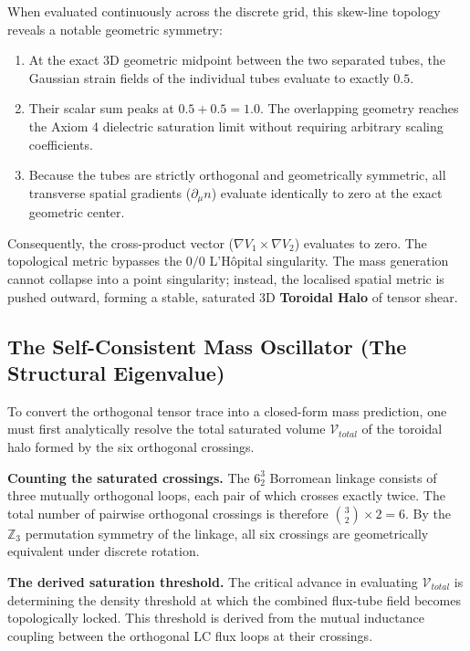 When evaluated continuously across the discrete grid, this skew-line topology reveals a notable geometric symmetry:
\begin{enumerate}
    \item At the exact 3D geometric midpoint between the two separated tubes, the Gaussian strain fields of the individual tubes evaluate to exactly $0.5$. 
    \item Their scalar sum peaks at $0.5 + 0.5 = \mathbf{1.0}$. The overlapping geometry reaches the Axiom 4 dielectric saturation limit without requiring arbitrary scaling coefficients.
    \item Because the tubes are strictly orthogonal and geometrically symmetric, all transverse spatial gradients ($\partial_\mu n$) evaluate identically to zero at the exact geometric center.
\end{enumerate}

Consequently, the cross-product vector ($\nabla V_1 \times \nabla V_2$) evaluates to zero. The topological metric bypasses the $0/0$ L'Hôpital singularity. The mass generation cannot collapse into a point singularity; instead, the localised spatial metric is pushed outward, forming a stable, saturated 3D \textbf{Toroidal Halo} of tensor shear.

\subsection{The Self-Consistent Mass Oscillator (The Structural Eigenvalue)}
To convert the orthogonal tensor trace into a closed-form mass prediction, one must first analytically resolve the total saturated volume $\mathcal{V}_{total}$ of the toroidal halo formed by the six orthogonal crossings.

\textbf{Counting the saturated crossings.} The $6^3_2$ Borromean linkage consists of three mutually orthogonal loops, each pair of which crosses exactly twice. The total number of pairwise orthogonal crossings is therefore $\binom{3}{2} \times 2 = 6$. By the $\mathbb{Z}_3$ permutation symmetry of the linkage, all six crossings are geometrically equivalent under discrete rotation.

\textbf{The derived saturation threshold.} The critical advance in evaluating $\mathcal{V}_{total}$ is determining the density threshold at which the combined flux-tube field becomes topologically locked. This threshold is derived from the mutual inductance coupling between the orthogonal LC flux loops at their crossings.

